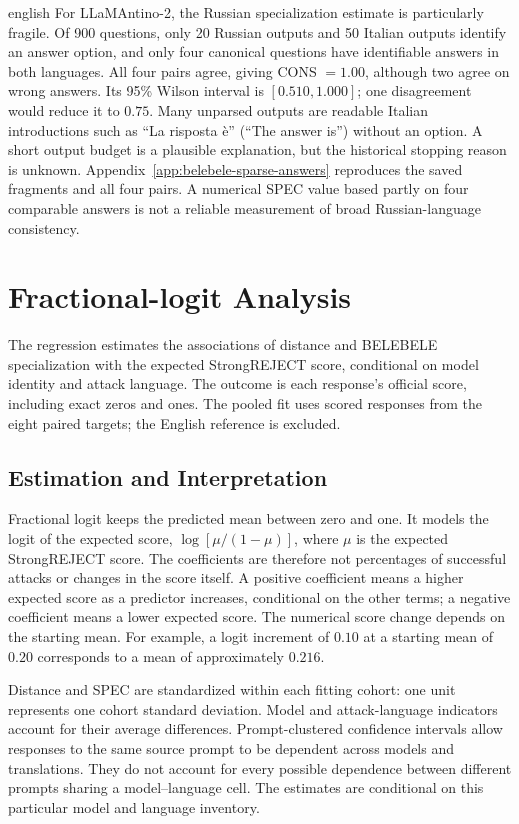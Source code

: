\begin{otherlanguage*}{english}
For LLaMAntino-2, the Russian specialization estimate is particularly fragile. Of 900 questions, only 20 Russian outputs and 50 Italian outputs identify an answer option, and only four canonical questions have identifiable answers in both languages. All four pairs agree, giving CONS $=1.00$, although two agree on wrong answers. Its 95\% Wilson interval is $[0.510,1.000]$; one disagreement would reduce it to $0.75$. Many unparsed outputs are readable Italian introductions such as ``La risposta è'' (``The answer is'') without an option. A short output budget is a plausible explanation, but the historical stopping reason is unknown. Appendix~\ref{app:belebele-sparse-answers} reproduces the saved fragments and all four pairs. A numerical SPEC value based partly on four comparable answers is not a reliable measurement of broad Russian-language consistency.

\section{Fractional-logit Analysis}
\label{sec:graded-inference}

The regression estimates the associations of distance and BELEBELE specialization with the expected StrongREJECT score, conditional on model identity and attack language. The outcome is each response's official score, including exact zeros and ones. The pooled fit uses \GMainN{} scored responses from the eight paired targets; the English reference is excluded.

\subsection{Estimation and Interpretation}

Fractional logit keeps the predicted mean between zero and one. It models the logit of the expected score, $\log[\mu/(1-\mu)]$, where $\mu$ is the expected StrongREJECT score. The coefficients are therefore not percentages of successful attacks or changes in the score itself. A positive coefficient means a higher expected score as a predictor increases, conditional on the other terms; a negative coefficient means a lower expected score. The numerical score change depends on the starting mean. For example, a logit increment of $0.10$ at a starting mean of $0.20$ corresponds to a mean of approximately $0.216$.

Distance and SPEC are standardized within each fitting cohort: one unit represents one cohort standard deviation. Model and attack-language indicators account for their average differences. Prompt-clustered confidence intervals allow responses to the same source prompt to be dependent across models and translations. They do not account for every possible dependence between different prompts sharing a model--language cell. The estimates are conditional on this particular model and language inventory.


\end{otherlanguage*}
